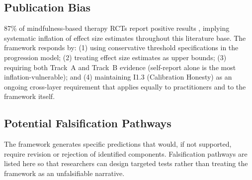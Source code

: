 \documentclass[12pt, a4paper]{article}
\begin{document}
\subsection{Publication Bias}

87\% of mindfulness-based therapy RCTs report positive results \citep{coronado2016},
implying systematic inflation of effect size estimates throughout this literature base.
The framework responds by: (1) using conservative threshold specifications in the
progression model; (2) treating effect size estimates as upper bounds; (3) requiring
both Track~A and Track~B evidence (self-report alone is the most inflation-vulnerable);
and (4) maintaining I1.3 (Calibration Honesty) as an ongoing cross-layer requirement
that applies equally to practitioners and to the framework itself.

\subsection{Potential Falsification Pathways}

The framework generates specific predictions that would, if not supported, require
revision or rejection of identified components. Falsification pathways are
listed here so that researchers can design targeted tests rather than treating
the framework as an unfalsifiable narrative.
\end{document}
